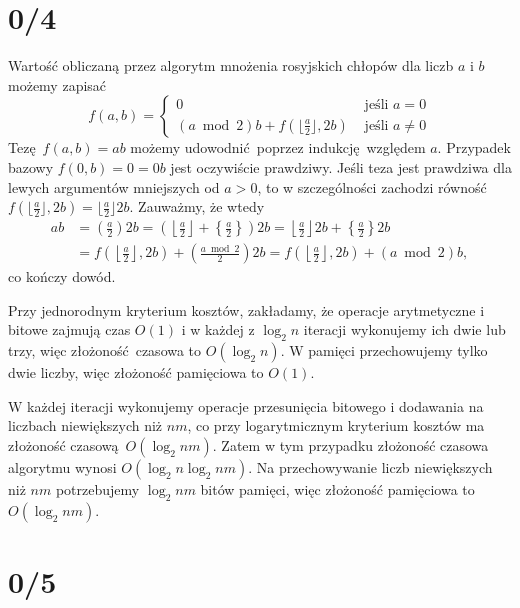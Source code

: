 \documentclass[a4paper, 12pt]{article}
\newcommand{\+}{\enspace}
\begin{document}
\section*{0/4}
Wartość obliczaną przez algorytm mnożenia rosyjskich chłopów dla liczb
$a$ i $b$
możemy zapisać
$$f(a,b) =
\begin{cases}
	0 & \text{ jeśli }a = 0 \\
	(a \bmod 2)b + f(\lfloor\frac{a}{2}\rfloor, 2b) & \text{ jeśli }a ≠ 0
\end{cases}
$$
Tezę $f(a,b) = ab$ możemy udowodnić poprzez indukcję względem $a$.
Przypadek bazowy $f(0,b) = 0 = 0b$ jest oczywiście prawdziwy.
Jeśli teza jest prawdziwa dla lewych argumentów mniejszych od $a>0$,
to w szczególności zachodzi równość $f(\lfloor\frac{a}{2}\rfloor, 2b) = \lfloor\frac{a}{2}\rfloor 2b.$
Zauważmy, że wtedy
\begin{align*}
ab
&= \left(\frac{a}{2}\right)2b
= \left(\left\lfloor\frac{a}{2}\right\rfloor + \left\{\frac{a}{2}\right\}\right)2b
= \left\lfloor\frac{a}{2}\right\rfloor2b + \left\{\frac{a}{2}\right\}2b \\
&= f\left(\left\lfloor\frac{a}{2}\right\rfloor,2b\right) + \left(\frac{a \bmod 2}{2}\right)2b
= f\left(\left\lfloor\frac{a}{2}\right\rfloor,2b\right) + (a \bmod 2)b,
\end{align*}
co kończy dowód.

Przy jednorodnym kryterium kosztów, zakładamy, że operacje arytmetyczne i
bitowe zajmują czas $O(1)$ i w każdej z
$\log_2 n$ iteracji wykonujemy ich dwie lub trzy, więc złożoność czasowa to
$O(\log_2 n)$.
W pamięci przechowujemy tylko dwie liczby, więc złożoność pamięciowa to $O(1)$.

W każdej iteracji wykonujemy operacje przesunięcia bitowego i dodawania na
liczbach niewiększych niż $nm$, co przy logarytmicznym kryterium kosztów ma
złożoność czasową $O(\log_2 nm)$.
Zatem w tym przypadku złożoność czasowa algorytmu wynosi
$O(\log_2 n \log_2 nm)$.
Na przechowywanie liczb niewiększych niż $nm$ potrzebujemy $\log_2 nm$ bitów
pamięci, więc złożoność pamięciowa to $O(\log_2 nm)$.

\section*{0/5}
\end{document}
